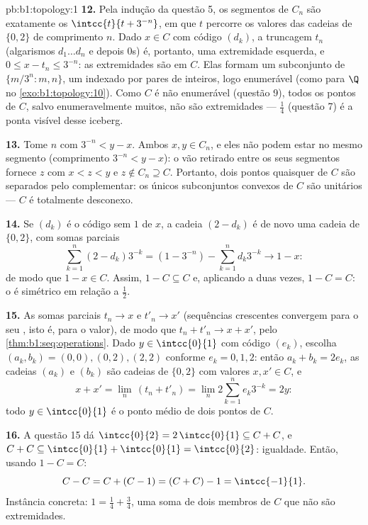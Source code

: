 \begin{solution}{pb:b1:topology:1}
\textbf{12.} Pela indução da questão 5, os segmentos de
$C_n$ são exatamente os $\intcc{t}{t + 3^{-n}}$, em que $t$ percorre
os valores das cadeias de $\{0,2\}$ de comprimento $n$. Dado $x \in C$
com código $(d_k)$, a truncagem $t_n$ (algarismos $d_1 \dots d_n$
e depois $0$s) é, portanto, uma extremidade esquerda, e $0 \leq x - t_n
\leq 3^{-n}$: as extremidades são  em $C$. Elas formam um subconjunto
de $\{m/3^n : m, n\}$, um  indexado por pares de inteiros, logo
enumerável (como para $\Q$ no \cref{exo:b1:topology:10}). Como $C$
é não enumerável (questão 9), todos os pontos de $C$, salvo
enumeravelmente muitos, não são extremidades --- $\frac14$ (questão 7)
é a ponta visível desse iceberg.

\textbf{13.} Tome $n$ com $3^{-n} < y - x$. Ambos $x, y \in
C_n$, e eles não podem estar no mesmo segmento (comprimento $3^{-n} <
y - x$): o vão retirado entre os seus segmentos fornece $z$
com $x < z < y$ e $z \notin C_n \supseteq C$. Portanto, dois pontos
quaisquer de $C$ são separados pelo complementar: os únicos subconjuntos
convexos de $C$ são unitários --- $C$ é totalmente desconexo.

\textbf{14.} Se $(d_k)$ é o código sem $1$ de $x$, a cadeia
$(2 - d_k)$ é de novo uma cadeia de $\{0,2\}$, com somas parciais
\[
\sum_{k=1}^{n} (2 - d_k)3^{-k} = (1 - 3^{-n}) - \sum_{k=1}^n
d_k 3^{-k} \longrightarrow 1 - x :
\]
de modo que $1 - x \in C$. Assim, $1 - C \subseteq C$ e, aplicando a 
duas vezes, $1 - C = C$: o  é simétrico em relação a
$\frac12$.

\textbf{15.} As somas parciais $t_n \to x$ e $t'_n \to x'$
(sequências crescentes convergem para o seu , isto é, para o
valor), de modo que $t_n + t'_n \to x + x'$, pelo
\cref{thm:b1:seq:operations}. Dado $y \in \intcc{0}{1}$ com
código $(e_k)$, escolha $(a_k, b_k) = (0,0), (0,2), (2,2)$
conforme $e_k = 0, 1, 2$: então $a_k + b_k = 2e_k$, as
cadeias $(a_k)$ e $(b_k)$ são cadeias de $\{0,2\}$ com valores $x,
x' \in C$, e
\[
x + x' = \lim_n\,(t_n + t'_n) = \lim_n 2\sum_{k=1}^n e_k 3^{-k}
= 2y :
\]
todo $y \in \intcc{0}{1}$ é o ponto médio de dois pontos de $C$.

\textbf{16.} A questão 15 dá $\intcc{0}{2} = 2\,\intcc{0}{1}
\subseteq C + C$, e $C + C \subseteq \intcc{0}{1} +
\intcc{0}{1} = \intcc{0}{2}$: igualdade. Então, usando $1 - C = C$:
\[
C - C = C + (C - 1) = (C + C) - 1 = \intcc{-1}{1} .
\]
Instância concreta: $1 = \frac14 + \frac34$, uma soma de dois
membros de $C$ que não são extremidades.


\end{solution}
